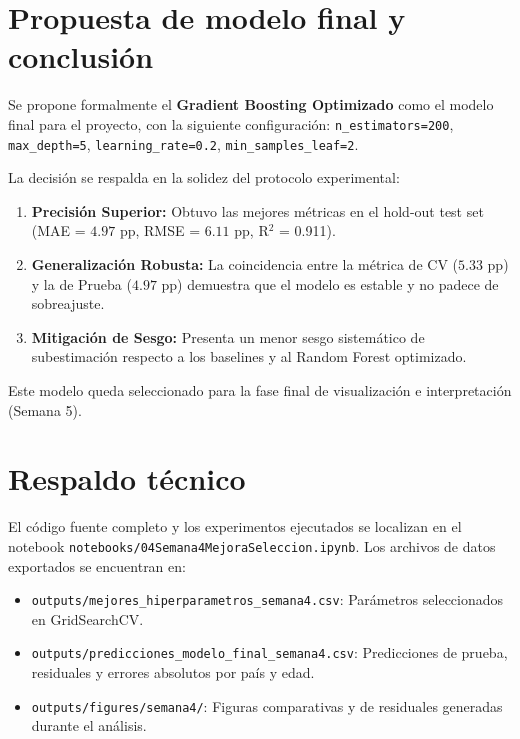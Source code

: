 \documentclass[12pt,a4paper]{article}
\begin{document}
\section{Propuesta de modelo final y conclusión}

Se propone formalmente el \textbf{Gradient Boosting Optimizado} como el modelo final para el proyecto, con la siguiente configuración: \texttt{n\_estimators=200}, \texttt{max\_depth=5}, \texttt{learning\_rate=0.2}, \texttt{min\_samples\_leaf=2}.

La decisión se respalda en la solidez del protocolo experimental:
\begin{enumerate}
    \item \textbf{Precisión Superior:} Obtuvo las mejores métricas en el hold-out test set (MAE = $4.97$ pp, RMSE = $6.11$ pp, R$^2$ = 0.911).
    \item \textbf{Generalización Robusta:} La coincidencia entre la métrica de CV ($5.33$ pp) y la de Prueba ($4.97$ pp) demuestra que el modelo es estable y no padece de sobreajuste.
    \item \textbf{Mitigación de Sesgo:} Presenta un menor sesgo sistemático de subestimación respecto a los baselines y al Random Forest optimizado.
\end{enumerate}

Este modelo queda seleccionado para la fase final de visualización e interpretación (Semana 5).

\section{Respaldo técnico}

El código fuente completo y los experimentos ejecutados se localizan en el notebook \texttt{notebooks/04Semana4MejoraSeleccion.ipynb}.
Los archivos de datos exportados se encuentran en:
\begin{itemize}
    \item \texttt{outputs/mejores\_hiperparametros\_semana4.csv}: Parámetros seleccionados en GridSearchCV.
    \item \texttt{outputs/predicciones\_modelo\_final\_semana4.csv}: Predicciones de prueba, residuales y errores absolutos por país y edad.
    \item \texttt{outputs/figures/semana4/}: Figuras comparativas y de residuales generadas durante el análisis.
\end{itemize}
\end{document}
